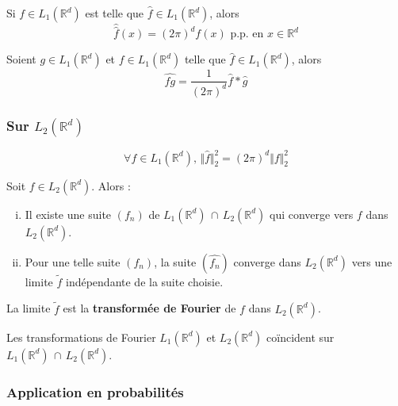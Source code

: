 
	\begin{theorem}
		Si $f \in L_1(\mathbb{R}^d)$ est telle que $\widehat{f} \in L_1(\mathbb{R}^d)$, alors
		\[ \widehat{\widehat{f}}(x) = (2\pi)^d f(x) \text{ p.p. en } x \in \mathbb{R}^d \]
	\end{theorem}

	\begin{proposition}
		Soient $g \in L_1(\mathbb{R}^d)$ et $f \in L_1(\mathbb{R}^d)$ telle que $\widehat{f} \in L_1(\mathbb{R}^d)$, alors
		\[ \widehat{fg} = \frac{1}{(2\pi)^d} \widehat{f} * \widehat{g} \]
	\end{proposition}

	\subsubsection{Sur \texorpdfstring{$L_2(\mathbb{R}^d)$}{Rᵈ}}

	\begin{theorem}
		\[ \forall f \in L_1(\mathbb{R}^d), \, \Vert \widehat{f} \Vert^2_2 = (2 \pi)^d \Vert f \Vert^2_2 \]
	\end{theorem}

	\begin{theorem}
		Soit $f \in L_2(\mathbb{R}^d)$. Alors :
		\begin{enumerate}[(i)]
			\item Il existe une suite $(f_n)$ de $L_1(\mathbb{R}^d) \, \cap \, L_2(\mathbb{R}^d)$ qui converge vers $f$ dans $L_2(\mathbb{R}^d)$.
			\item Pour une telle suite $(f_n)$, la suite $(\widehat{f_n})$ converge dans $L_2(\mathbb{R}^d)$ vers une limite $\widetilde{f}$ indépendante de la suite choisie.
		\end{enumerate}
	\end{theorem}

	\begin{definition}
		La limite $\widetilde{f}$ est la \textbf{transformée de Fourier} de $f$ dans $L_2(\mathbb{R}^d)$.
	\end{definition}

	\begin{proposition}
		Les transformations de Fourier $L_1(\mathbb{R}^d)$ et $L_2(\mathbb{R}^d)$ coïncident sur $L_1(\mathbb{R}^d) \, \cap \, L_2(\mathbb{R}^d)$.
	\end{proposition}

	\subsubsection{Application en probabilités}


